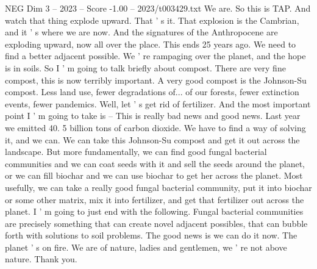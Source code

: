 \begin{textsample}{NEG Dim 3 – 2023 – Score -1.00 – 2023/t003429.txt}
We are.
So this is TAP.
And watch that thing explode upward.
That ' s it.
That explosion is the Cambrian, and it ' s where we are now.
And the signatures of the Anthropocene are exploding upward, now all over the place.
This ends 25 years ago.
We need to find a better adjacent possible.
We ' re rampaging over the planet, and the hope is in soils.
So I ' m going to talk briefly about compost.
There are very fine compost, this is now terribly important.
A very good compost is the Johnson-Su compost.
Less land use, fewer degradations of... of our forests, fewer extinction events, fewer pandemics.
Well, let ' s get rid of fertilizer.
And the most important point I ' m going to take is -- This is really bad news and good news.
Last year we emitted 40. 5 billion tons of carbon dioxide.
We have to find a way of solving it, and we can.
We can take this Johnson-Su compost and get it out across the landscape.
But more fundamentally, we can find good fungal bacterial communities and we can coat seeds with it and sell the seeds around the planet, or we can fill biochar and we can use biochar to get her across the planet.
Most usefully, we can take a really good fungal bacterial community, put it into biochar or some other matrix, mix it into fertilizer, and get that fertilizer out across the planet.
I ' m going to just end with the following.
Fungal bacterial communities are precisely something that can create novel adjacent possibles, that can bubble forth with solutions to soil problems.
The good news is we can do it now.
The planet ' s on fire.
We are of nature, ladies and gentlemen, we ' re not above nature.
Thank you.

\end{textsample}
